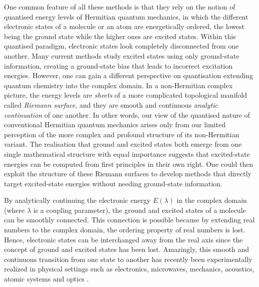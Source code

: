 \documentclass[11pt,a4paper]{article}
\begin{document}
One common feature of all these methods is that they rely on the notion of quantised energy levels of Hermitian quantum mechanics, in which the different electronic states of a molecule or an atom are energetically ordered, the lowest being the ground state while the higher ones are excited states. 
Within this quantised paradigm, electronic states look completely disconnected from one another.
Many current methods study excited states using only ground-state information, creating a ground-state bias that leads to incorrect excitation energies.
However, one can gain a different perspective on quantisation extending quantum chemistry into the complex domain.
In a non-Hermitian complex picture, the energy levels are \textit{sheets} of a more complicated topological manifold called \textit{Riemann surface}, and they are smooth and continuous \textit{analytic continuation} of one another.
In other words, our view of the quantised nature of conventional Hermitian quantum mechanics arises only from our limited perception of the more complex and profound structure of its non-Hermitian variant.
The realisation that ground and excited states both emerge from one single mathematical structure with equal importance suggests that excited-state energies can be computed from first principles in their own right.
One could then exploit the structure of these Riemann surfaces to develop methods that directly target excited-state energies without needing ground-state information.

By analytically continuing the electronic energy $E(\lambda)$ in the complex domain (where $\lambda$ is a coupling parameter), the ground and excited states of a molecule can be smoothly connected.
This connection is possible because by extending real numbers to the complex domain, the ordering property of real numbers is lost.
Hence, electronic states can be interchanged away from the real axis since the concept of ground and excited states has been lost.
Amazingly, this smooth and continuous transition from one state to another has recently been experimentally realized in physical settings such as electronics, microwaves, mechanics, acoustics, atomic systems and optics \cite{Bittner_2012, Chong_2011, Chtchelkatchev_2012, Doppler_2016, Guo_2009, Hang_2013, Liertzer_2012, Longhi_2010, Peng_2014, Peng_2014a, Regensburger_2012, Ruter_2010, Schindler_2011, Szameit_2011, Zhao_2010, Zheng_2013, Choi_2018, El-Ganainy_2018}.
\end{document}
